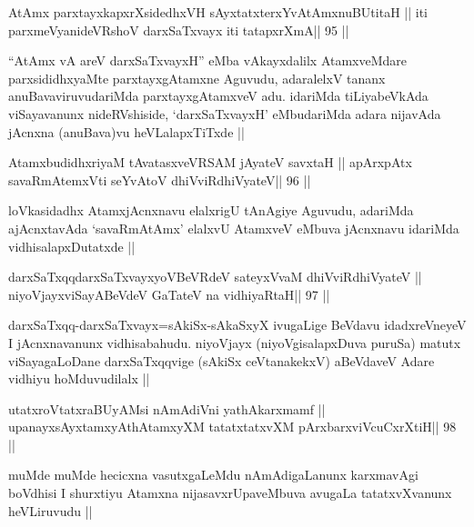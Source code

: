 \begin{shl}
AtAmx parxtayxkapxrXsidedhxVH sAyxtatxterxYvA\s\s tAmxnuBUtitaH ||
iti parxmeVyanideVRshoV darxSaTxvayx iti tatapxrXmA\hfill || 95 ||
\end{shl}

\begin{artha}
``AtAmx vA areV darxSaTxvayxH'' eMba vAkayxdalilx AtamxveMdare
  parxsididhxyaMte parxtayxgAtamxne Aguvudu, adaralelxV tananx
  anuBavaviruvudariMda parxtayxgAtamxveV adu. idariMda tiLiyabeVkAda
  viSayavanunx nideRVshiside, `darxSaTxvayxH' eMbudariMda adara
  nijavAda jAcnxna (anuBava)vu heVLalapxTiTxde ||
\end{artha}


\begin{shl}
AtamxbudidhxriyaM tAvatasxveVRSAM jAyateV savxtaH ||
apArxpAtx savaRmAtemxVti seYvAtoV dhiVviRdhiVyateV\hfill || 96 ||
\end{shl}

\begin{artha}
loVkasidadhx AtamxjAcnxnavu elalxrigU tAnAgiye Aguvudu, adariMda
ajAcnxtavAda `savaRmAtAmx' elalxvU AtamxveV eMbuva jAcnxnavu idariMda
vidhisalapxDutatxde ||
\end{artha}


\begin{shl}
darxSaTxqqdarxSaTxvayxyoVBeVRdeV sateyxVvaM dhiVviRdhiVyateV ||
niyoVjayxviSayABeVdeV GaTateV na vidhiyaRtaH\hfill || 97 ||
\end{shl}

\begin{artha}
darxSaTxqq-darxSaTxvayx=sAkiSx-sAkaSxyX ivugaLige BeVdavu
idadxreVneyeV I jAcnxnavanunx vidhisabahudu. niyoVjayx
(niyoVgisalapxDuva puruSa) matutx viSayagaLoDane darxSaTxqqvige
(sAkiSx ceVtanakekxV) aBeVdaveV Adare vidhiyu hoMduvudilalx || 
\end{artha}


\begin{shl}
\footnotemark[1]utatxroVtatxraBUyAMsi nAmAdiVni yathAkarxmamf ||
upanayxsAyx\s\s tamxyAthAtamxyXM tatatxtatxvXM pArxbarxviVcuCxrXtiH\hfill || 98 ||
\end{shl}

\begin{artha}
muMde muMde hecicxna vasutxgaLeMdu nAmAdigaLanunx karxmavAgi boVdhisi
I shurxtiyu Atamxna nijasavxrUpaveMbuva avugaLa tatatxvXvanunx
heVLiruvudu ||
\end{artha}

